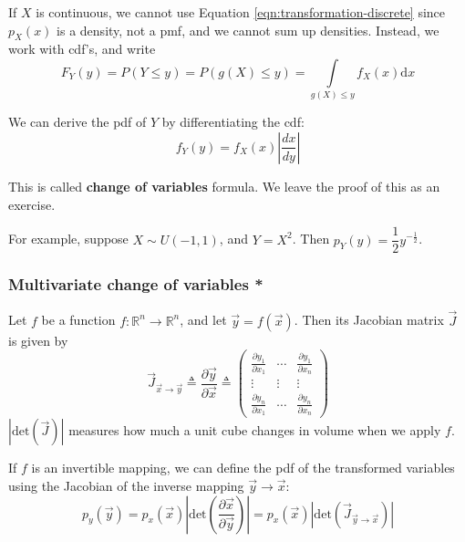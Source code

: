\documentclass[graybox, envcountchap, twocolumn]{styles/svmult}
\begin{document}
{If $X$ is continuous, we cannot use Equation \ref{eqn:transformation-discrete} since $p_X(x)$ is a density, not a pmf, and we cannot sum up densities. Instead, we work with cdf’s, and write
\begin{equation}
F_Y(y)=P(Y \leq y)=P(g(X) \leq y)=\int\limits_{g(X) \leq y} f_X(x)\mathrm{d}x
\end{equation}

We can derive the pdf of $Y$ by differentiating the cdf:
\begin{equation}\label{eqn:General-transformations}
f_Y(y)=f_X(x)|\dfrac{dx}{dy}|
\end{equation}

This is called \textbf{change of variables} formula. We leave the proof of this as an exercise. 

For example, suppose $X \sim U(−1,1)$, and $Y=X^2$. Then $p_Y(y)=\dfrac{1}{2}y^{-\frac{1}{2}}$.


\subsubsection{Multivariate change of variables *}
Let $f$ be a function $f:\mathbb{R}^n \rightarrow \mathbb{R}^n$, and let $\vec{y}=f(\vec{x})$. Then its Jacobian matrix $\vec{J}$ is given by
\begin{equation}
\vec{J}_{\vec{x} \rightarrow \vec{y}} \triangleq \frac{\partial \vec{y}}{\partial \vec{x}} \triangleq \left(\begin{array}{ccc}
\frac{\partial y_1}{\partial x_1} & \cdots & \frac{\partial y_1}{\partial x_n} \\
\vdots & \vdots & \vdots \\
\frac{\partial y_n}{\partial x_1} & \cdots & \frac{\partial y_n}{\partial x_n}
\end{array}\right)
\end{equation}
$|\mathrm{det}(\vec{J})|$ measures how much a unit cube changes in volume when we apply $f$.

If $f$ is an invertible mapping, we can define the pdf of the transformed variables using the Jacobian of the inverse mapping $\vec{y} \rightarrow \vec{x}$:
\begin{equation}\label{eqn:Multivariate-transformation}
p_y(\vec{y})=p_x(\vec{x})|\mathrm{det}(\frac{\partial \vec{x}}{\partial \vec{y}})|=p_x(\vec{x})|\mathrm{det}(\vec{J}_{\vec{y} \rightarrow \vec{x}})|
\end{equation}


}
\end{document}
